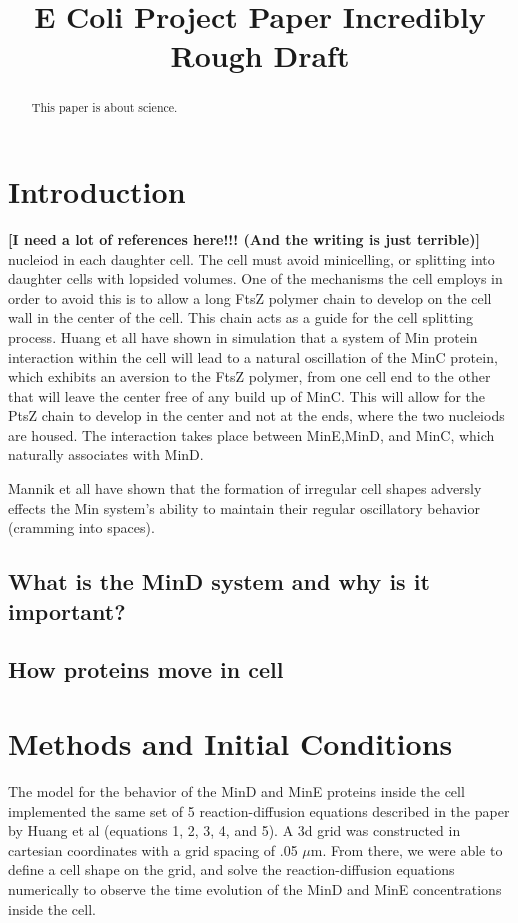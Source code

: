 \documentclass[letterpaper,twocolumn,amsmath,amssymb,pre]{revtex4-1}
\newcommand{\red}[1]{{\bf \color{red} #1}}
\newcommand{\fixme}[1]{\red{[#1]}}
\begin{document}
\title{E Coli Project Paper Incredibly Rough Draft}

\begin{abstract}
  This paper is about science.
\end{abstract}
\section{Introduction}
\fixme{I need a lot of references here!!!  (And the writing is just terrible)}
nucleiod in each daughter cell.  The cell must avoid minicelling, or
splitting into daughter cells with lopsided volumes.  One of the mechanisms
the cell employs in order to avoid this is to allow a long FtsZ polymer
chain to develop on the cell wall in the center of the cell.  This chain
acts as a guide for the cell splitting process.  Huang et all have shown in
simulation that a system of Min protein interaction within the cell will
lead to a natural oscillation of the MinC protein, which exhibits an
aversion to the FtsZ polymer, from one cell end to the other that will
leave the center free of any build up of MinC.  This will allow for the
PtsZ chain to develop in the center and not at the ends, where the two
nucleiods are housed.  The interaction takes place between MinE,MinD, and
MinC, which naturally associates with MinD.

Mannik et all have shown that the formation of irregular cell shapes
adversly effects the Min system's ability to maintain their regular
oscillatory behavior (cramming into spaces).

\subsection{What is the MinD system and why is it important?}
\subsection{How proteins move in cell}
\section{Methods and Initial Conditions}
The model for the behavior of the MinD and MinE proteins inside the cell
implemented the same set of 5 reaction-diffusion equations described in the paper
by Huang et al (equations 1, 2, 3, 4, and 5). A 3d grid was constructed in
cartesian coordinates with a grid spacing of .05 $\mu$m. From there, we
were able to define a cell shape on the grid, and solve the
reaction-diffusion equations numerically to observe the time evolution of
the MinD and MinE concentrations inside the cell.
\end{document}
